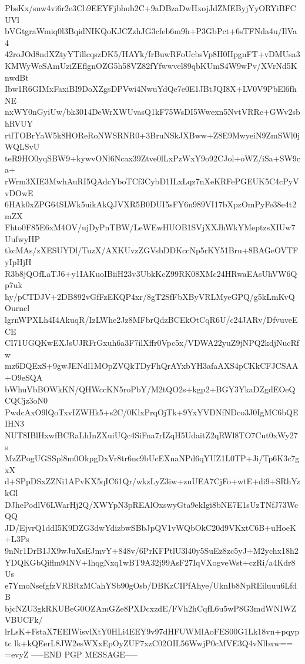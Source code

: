 PbsKx/snw4vi6r2e3Cb9EEYFjbhub2C+9aDBzaDwHxojJdZMEByjYyORYiBFCUVl
bVGtgraWmiq0l3BqidNIKQoKJCZzhJG3cfeb6m9h+P3GbPct+6sTFNda4u/IlVa4
42roJOd8ndXZtyYTillcqszDK5/HAYk/frBuwRFoUcbsVp8H0IIpgnFT+vDMUsa3
KMWyWeSAmUziZEflgnOZG5h58VZ82fYfwwvel89qbKUmS4W9wPv/XVrNd5KnwdBt
Ibw1R6GIMxFaxiBI9DoXZgsDPVwi4NwuYdQe7e0E1JBtJQI8X+LV0V9PbEl6fhNE
nxWY0nGyiUw/bk3014DeWrXWUvasQ1kF75WsDI5Wwexn5NvtVRRc+GWv2sbhRVUY
rtlTOBrYaW5k8HOReRoNWSRNR0+3BruNSkJXBww+Z8E9MwyeiN9ZmSWl0jWQLSvU
teR9HO0yqSBW9+kywvONl6Ncax39Ztve0lLxPzWxY9o92CJol+oWZ/iSa+SW9ca+
rWrm3XIE3MwhAuRI5QAdcYboTCf3CybD1ILxLqz7nXeKRFePGEUK5C4cPyVvDOwE
6HAk0xZPG64SLWk5uikAkQJVXR5B0DUI5sFY6n989VI17bXpzOmPyFe38e4t2mZX
Fhto0F85E6xM4OV/ujDyPnTBW/LeWEwHUOB1SVjXXJhWkYMeptzsXIUw7UufwyHP
tkcMAs/zXESUYDl/TuzX/AXKUvzZGVsbDDKccNp5rKY51Bru+8BAGeOVTFyIpHjH
R3b8jQOfLaTJ6+y1IAKuoIBiiH23v3UbkKcZ99RK08XMc24HRwaEAsUhVW6Qp7uk
hy/pCTDJV+2DB892vGfFzEKQP4xr/8gT2SfFbXByVRLMyeGPQ/g5kLmKvQOurncl
lgrnWPXLh4I4AkuqR/IzLWhe2Jz8MFbrQdzBCEkOtCqR6U/c24JARv/DfvuveECE
CI71UGQKwEXJsUJRFrGxuh6a3F7ilXffr0Vpc5x/VDWA22yuZ9jNPQ2kdjNucRfw
mz6DQExS+9gwJENdl1MOpZVQkTDyFhQrAYxbYH3afaAXS4pCKkCFJCSAA+O9eSQA
bWhuVbBOWkKN/QHWccKN5roPbY/M2tQO2s+kgp2+BGY3YkaDZgdEOeQCQCjz3oN0
PwdcAxO9lQoTxvIZWHk5+s2C/0KlxPrqOjTk+9YxYVDNfNDco3J0IgMC6bQEIHN3
NUT8IBlHxwfBCRaLhInZXuiUQc4SiFna7rIZqH5UdaitZ2qRWl8TO7Cut0xWy27s
MzZPogUGSSpl8m0OkpgDxVr8tr6nc9bUcEXnaNPd6qYUZ1L0TP+Ji/Tp6K3c7gxX
d+SPpDSxZZNi1APvKX5qIC61Qr/wkzLyZ3iw+zuUEA7CjFo+wtE+di9+SRhYzkGl
DJhePodlV6LWarHj2Q/XWYpN3pREAlOxswyGta9ekIgi8bNE7E1sUzTNfJ73WcQQ
JD/EjvrQ1ddI5K9DZG3dwYdizbwSBbJpQV1vWQbOkC20d9VKxtC6B+uHoeK+L3Ps
9nNr1DrB1JX9wJuXsEJmvY+848v/6PrKFPtlU3l40y5SuEz8zc5yJ+M2ychx18h2
YDQKGbQiflm94NV+IhqgNxq1wBT9A32j99AsF27IqVXogveWst+czRi/a4Kdr8Us
e7YmoNsefgfzVRBRzMCahYSb90gOsb/DBKzCIPfAhye/UknIb8NpREiluuu6LfdB
bjcNZU3gkRKUBeG0OZAmGZe8PXDcxzdE/FVh2hCqfL6u5wP8G3mdWNIWZVBUCFk/
lrLsK+FstaX7EEIWisvlXtY0HLi4EEY9v97dHFUWMlAoFES00G1Lk18vn+pqyptc
lk+kQEerL8JW2esWXxEpOyZUF7xzC02OIL56WwjP0cMVE3Q4vNlbxw==
=evyZ
-----END PGP MESSAGE-----
